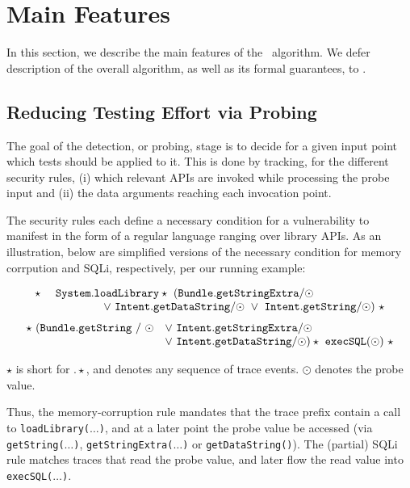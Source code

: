 \section{Main Features}\label{Se:corealg}

In this section, we describe the main features of the \Tool\ algorithm. We defer description of the overall algorithm, as well as its formal guarantees, to .

\subsection{Reducing Testing Effort via Probing}\label{Se:detectionSubsec}

The goal of the detection, or probing, stage is to decide for a given input point which tests should be applied to it. This is done by tracking, for the different security rules, (i) which relevant APIs are invoked while processing the probe input and (ii) the data arguments reaching each invocation point. 

The security rules each define a necessary condition for a vulnerability to manifest in the form of a regular language ranging over library APIs. As an illustration, below are simplified versions of the necessary condition for memory corrpution and SQLi, respectively, per our running example:

\begin{scriptsize}
$$
\begin{array}{rl}
	\star\ & {\tt System.loadLibrary}  
	\star\ ({\tt Bundle.getStringExtra / \odot} \\ & \hspace{1.5cm} \vee\ {\tt Intent.getDataString / \odot}\  
	\vee\ {\tt Intent.getString / \odot})\ \star
\end{array}
$$
$$
\begin{array}{rl}
	\star\ ({\tt Bundle.getString\ /\ \odot} & \vee\ {\tt Intent.getStringExtra / \odot} \\ 
	& \vee\ {\tt Intent.getDataString / \odot}) \star\ {\tt execSQL(\odot)}\ \star
\end{array}
$$
\end{scriptsize}
$\star$ is short for $. \star$, and denotes any sequence of trace events. $\odot$ denotes the probe value. 

Thus, the memory-corruption rule mandates that the trace prefix contain a call to {\tt loadLibrary($\ldots$)}, and at a later point the probe value be accessed (via {\tt getString($\ldots$)}, {\tt getStringExtra($\ldots$)} or {\tt getDataString()}). The (partial) SQLi rule matches traces that read the probe value, and later flow the read value into {\tt execSQL($\ldots$)}.

